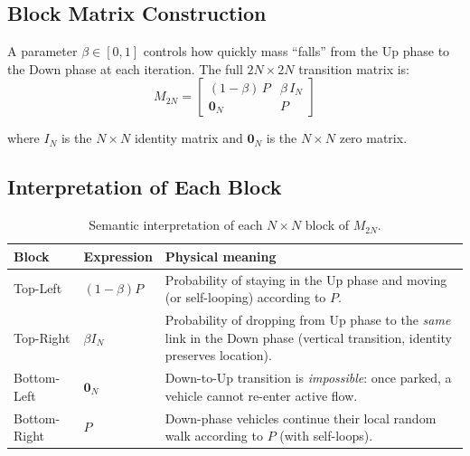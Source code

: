 \documentclass[12pt,a4paper]{article}
\theoremstyle{definition}
\theoremstyle{plain}
\begin{document}
\subsection{Block Matrix Construction}

A parameter $\beta \in [0,1]$ controls how quickly mass ``falls'' from the Up phase to
the Down phase at each iteration. The full $2N \times 2N$ transition matrix is:
\begin{equation}
  \boxed{M_{2N} =
  \begin{bmatrix}
    (1-\beta)\,P & \beta\,I_N \\
    \mathbf{0}_N & P
  \end{bmatrix}}
  \label{eq:block}
\end{equation}

\noindent where $I_N$ is the $N \times N$ identity matrix and $\mathbf{0}_N$ is the
$N \times N$ zero matrix.

\subsection{Interpretation of Each Block}

\begin{table}[H]
  \centering
  \caption{Semantic interpretation of each $N\!\times\!N$ block of $M_{2N}$.}
  \label{tab:blocks}
  \begin{tabular}{@{}llp{8cm}@{}}
    \toprule
    Block & Expression & Physical meaning\\
    \midrule
    Top-Left    & $(1-\beta)P$   & Probability of staying in the Up phase and
                                   moving (or self-looping) according to $P$.\\
    Top-Right   & $\beta I_N$    & Probability of dropping from Up phase to the
                                   \emph{same} link in the Down phase (vertical
                                   transition, identity preserves location).\\
    Bottom-Left & $\mathbf{0}_N$ & Down-to-Up transition is \emph{impossible}: once
                                   parked, a vehicle cannot re-enter active flow.\\
    Bottom-Right& $P$            & Down-phase vehicles continue their local random
                                   walk according to $P$ (with self-loops).\\
    \bottomrule
  \end{tabular}
\end{table}
\end{document}
